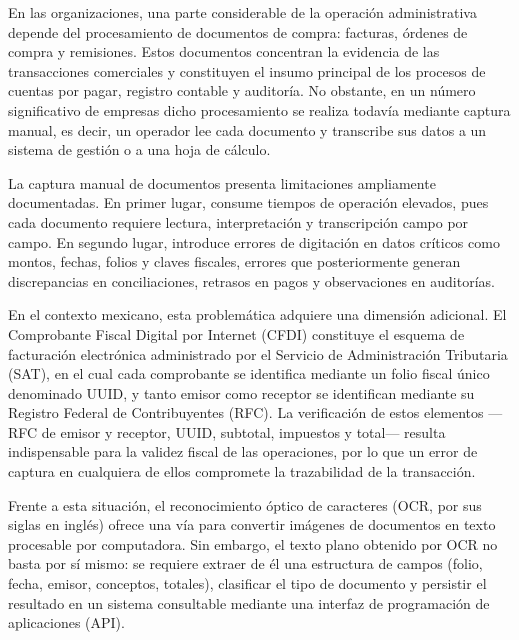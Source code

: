 En las organizaciones, una parte considerable de la operación administrativa depende del procesamiento de documentos de compra: facturas, órdenes de compra y remisiones. Estos documentos concentran la evidencia de las transacciones comerciales y constituyen el insumo principal de los procesos de cuentas por pagar, registro contable y auditoría. No obstante, en un número significativo de empresas dicho procesamiento se realiza todavía mediante captura manual, es decir, un operador lee cada documento y transcribe sus datos a un sistema de gestión o a una hoja de cálculo\cite{ap_digitization_2024}.

La captura manual de documentos presenta limitaciones ampliamente documentadas. En primer lugar, consume tiempos de operación elevados, pues cada documento requiere lectura, interpretación y transcripción campo por campo. En segundo lugar, introduce errores de digitación en datos críticos como montos, fechas, folios y claves fiscales, errores que posteriormente generan discrepancias en conciliaciones, retrasos en pagos y observaciones en auditorías\cite{manual_entry_errors_2023}.

En el contexto mexicano, esta problemática adquiere una dimensión adicional. El Comprobante Fiscal Digital por Internet (CFDI) constituye el esquema de facturación electrónica administrado por el Servicio de Administración Tributaria (SAT), en el cual cada comprobante se identifica mediante un folio fiscal único denominado UUID, y tanto emisor como receptor se identifican mediante su Registro Federal de Contribuyentes (RFC)\cite{sat_cfdi_2024}. La verificación de estos elementos —RFC de emisor y receptor, UUID, subtotal, impuestos y total— resulta indispensable para la validez fiscal de las operaciones, por lo que un error de captura en cualquiera de ellos compromete la trazabilidad de la transacción\cite{sat_cfdi_validation_2023}.

Frente a esta situación, el reconocimiento óptico de caracteres (OCR, por sus siglas en inglés) ofrece una vía para convertir imágenes de documentos en texto procesable por computadora\cite{tesseract_ocr}. Sin embargo, el texto plano obtenido por OCR no basta por sí mismo: se requiere extraer de él una estructura de campos (folio, fecha, emisor, conceptos, totales), clasificar el tipo de documento y persistir el resultado en un sistema consultable mediante una interfaz de programación de aplicaciones (API)\cite{structured_extraction_2023}.


